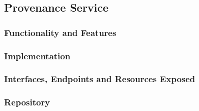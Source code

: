 \subsection{Provenance Service}
\subsubsection{Functionality and Features}
\subsubsection{Implementation}
\subsubsection{Interfaces, Endpoints and Resources Exposed}
\subsubsection{Repository}